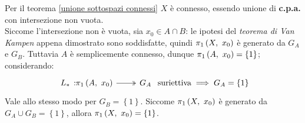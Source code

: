 \begin{demonstration}
	Per il teorema \ref{unione sottospazi connessi} $X$ è connesso, essendo unione di \textbf{c.p.a.} con intersezione non vuota.\\
	Siccome l'intersezione non è vuota, sia $x_0\in A\cap B$: le ipotesi del \textit{teorema di Van Kampen} appena dimostrato sono soddisfatte, quindi $\gruf{X}{x_0}$ è generato da $G_A$ e $G_B$. Tuttavia $A$ è semplicemente connesso, dunque $\gruf{A}{x_0}=\left\{1\right\}$; considerando:
	\begin{equation*}
		\surr {L_\ast} {\gruf{A}{x_0}} {G_A}\text{ suriettiva}\implies G_A=\left\{1\right\}
	\end{equation*} 
	Vale allo stesso modo per $G_B=\left\{1\right\}$. Siccome $\gruf{X}{x_0}$ è generato da $G_A\cup G_B=\left\{1\right\}$, allora $\gruf{X}{x_0}=\left\{1\right\}$.
\end{demonstration}
